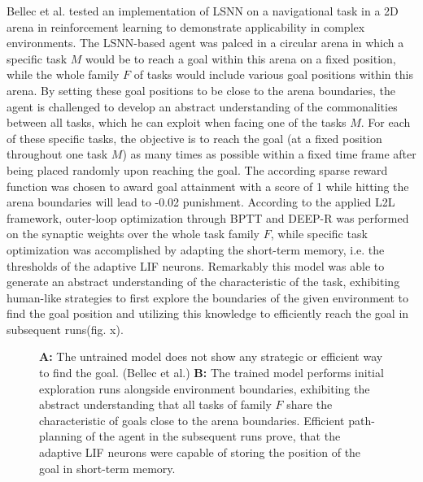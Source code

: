 \documentclass[letterpaper, 10 pt, conference]{ieeeconf}  %
\begin{document}
Bellec et al.\cite{bellecLongShorttermMemory2018} tested an implementation of LSNN on a navigational task in a 
2D arena in reinforcement learning to demonstrate applicability in 
complex environments. The LSNN-based agent was palced in a circular arena in which a specific task $M$ would be to reach a goal within this arena
on a fixed position, while the whole family $F$ of tasks would include various goal positions within this arena. By setting these goal positions 
to be close to the arena boundaries, the agent is challenged to develop an abstract understanding of the commonalities between all tasks, 
which he can exploit when facing one of the tasks $M$. For each of these specific tasks, the objective is 
to reach the goal (at a fixed position throughout one task $M$) as many times as possible within a fixed time frame after being placed randomly
upon reaching the goal. The according sparse reward function was chosen to award goal attainment with a score of 1 while hitting the arena
boundaries will lead to -0.02 punishment. According to the applied L2L framework, outer-loop optimization through BPTT and DEEP-R was performed on the
synaptic weights over the whole task family $F$, while specific task optimization was accomplished by 
adapting the short-term memory, i.e. the thresholds of the adaptive LIF neurons. Remarkably this model was able to generate an abstract understanding
of the characteristic of the task, exhibiting human-like strategies to first explore the boundaries of the given environment to find the goal 
position and utilizing this knowledge to efficiently reach the goal in subsequent runs(fig. x). 
\begin{figure}[thpb]
        \centering
\caption{\textbf{A:} The untrained model does not show any strategic or efficient way to find the goal. (Bellec et al.) \newline
\textbf{B:} The trained model performs initial exploration runs alongside environment boundaries, exhibiting the abstract understanding
that all tasks of family $F$ share the characteristic of goals close to the arena boundaries. Efficient path-planning of the agent 
in the subsequent runs prove, that the adaptive LIF neurons were capable of storing the position of the goal in short-term memory. 
\cite{bellecLongShorttermMemory2018}}
        \label{figurelabel}
        \end{figure}
        
\end{document}
